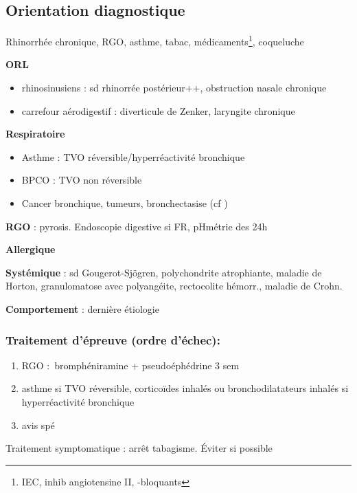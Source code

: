 \documentclass{book}
\begin{document}
\subsection{Orientation diagnostique}
\label{sec:orga2089e2}
\label{subsec:toux_orientation}
\begin{tcolorbox}
Rhinorrhée chronique, RGO, asthme, tabac, médicaments\footnote{IEC, inhib angiotensine II, \beta{}-bloquants}, coqueluche
\end{tcolorbox}
\textbf{ORL}

\begin{itemize}
\item rhinosinusiens : sd rhinorrée postérieur++, obstruction nasale chronique
\item carrefour aérodigestif : diverticule de Zenker, laryngite chronique
\end{itemize}

\textbf{Respiratoire} 

\begin{itemize}
\item Asthme : TVO réversible/hyperréactivité bronchique
\item BPCO : TVO non réversible
\item Cancer bronchique, tumeurs, bronchectasise (cf
)
\end{itemize}


\textbf{RGO} : pyrosis. Endoscopie digestive si FR, pHmétrie des 24h

\textbf{Allergique} 

\textbf{Systémique} : sd Gougerot-Sjögren, polychondrite atrophiante, maladie
de Horton, granulomatose avec polyangéite, rectocolite hémorr., maladie de
Crohn.

\textbf{Comportement} : dernière étiologie

\subsubsection{Traitement d'épreuve (ordre d'échec):}
\label{sec:org015b65a}
\begin{enumerate}
\item RGO : bromphéniramine + pseudoéphédrine 3 sem
\item asthme si TVO réversible, corticoïdes inhalés ou bronchodilatateurs inhalés si
hyperréactivité bronchique
\item avis spé
\end{enumerate}

Traitement symptomatique : arrêt tabagisme. Éviter si possible
\end{document}
